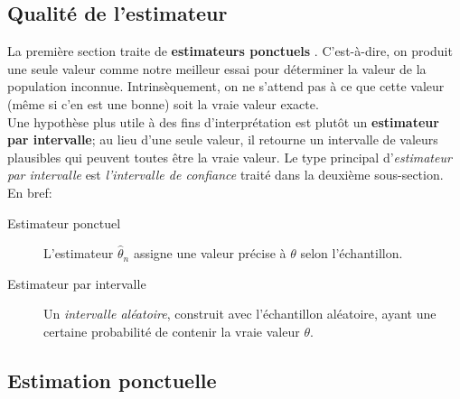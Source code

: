 \documentclass[10pt, french]{article}
\begin{document}
\begin{multicols*}{2}
\columnbreak
\section{Qualité de l'estimateur}

La première section traite de \guillemotleft \textbf{estimateurs ponctuels} \guillemotright. 
C'est-à-dire, on produit une seule valeur comme notre meilleur essai pour déterminer la valeur de la population inconnue.
Intrinsèquement, on ne s'attend pas à ce que cette valeur (même si c'en est une bonne) soit la vraie valeur exacte.\\

Une hypothèse plus utile à des fins d'interprétation est plutôt un \textbf{estimateur par intervalle}; au lieu d'une seule valeur, il retourne un intervalle de valeurs plausibles qui peuvent toutes être la vraie valeur. 
Le type principal d'\textit{estimateur par intervalle} est \textit{l'intervalle de confiance} traité dans la deuxième sous-section.\\

En bref:
\begin{description}
	\item[Estimateur ponctuel]	L'estimateur $\hat{\theta}_{n}$ assigne une valeur précise à $\theta$ selon l'échantillon.
	\item[Estimateur par intervalle]	Un \textit{intervalle aléatoire}, construit avec l'échantillon aléatoire, ayant une certaine probabilité de contenir la vraie valeur $\theta$.
\end{description}


\subsection{Estimation ponctuelle}


\end{multicols*}
\end{document}
